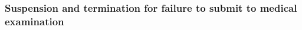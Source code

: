 \documentclass[12pt,a4paper]{article}
\begin{document}
%
%
%
%

\subsubsection[19. Suspension and termination for failure to submit to medical examination]{Suspension and termination for failure to submit to medical examination}
\end{document}
